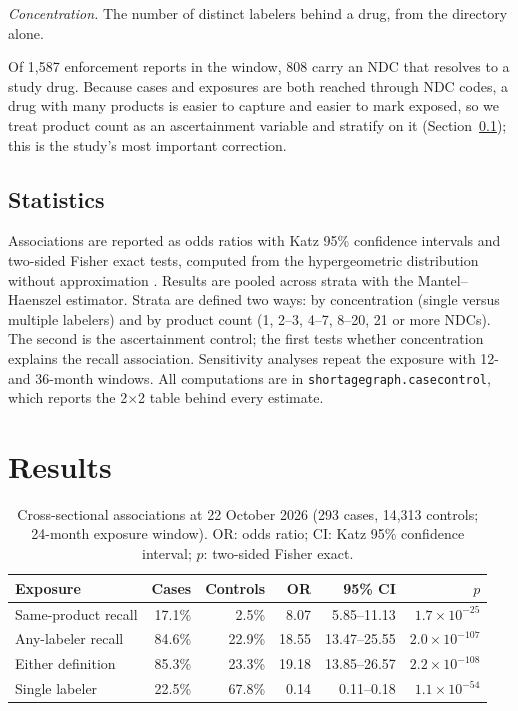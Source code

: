\documentclass[conference,letterpaper]{IEEEtran}
\begin{document}
\emph{Concentration.} The number of distinct labelers behind a drug, from the
directory alone.

Of 1{,}587 enforcement reports in the window, 808 carry an NDC that resolves to
a study drug. Because cases and exposures are both reached through NDC codes, a
drug with many products is easier to capture and easier to mark exposed, so we
treat product count as an ascertainment variable and stratify on it
(Section~\ref{sec:analysis}); this is the study's most important correction.

\subsection{Statistics}\label{sec:analysis}
Associations are reported as odds ratios with Katz 95\% confidence intervals and
two-sided Fisher exact tests, computed from the hypergeometric distribution
without approximation \cite{rothman}. Results are pooled across strata with the
Mantel--Haenszel estimator. Strata are defined two ways: by concentration
(single versus multiple labelers) and by product count (1, 2--3, 4--7, 8--20,
21 or more NDCs). The second is the ascertainment control; the first tests
whether concentration explains the recall association. Sensitivity analyses
repeat the exposure with 12- and 36-month windows. All computations are in
\texttt{shortagegraph.casecontrol}, which reports the 2$\times$2 table behind
every estimate.

\section{Results}

\begin{table}[t]
\caption{Cross-sectional associations at 22 October 2026 (293 cases, 14{,}313
controls; 24-month exposure window). OR: odds ratio; CI: Katz 95\% confidence
interval; $p$: two-sided Fisher exact.}
\label{tab:assoc}
\centering
\footnotesize
\setlength{\tabcolsep}{1.6pt}
\begin{tabular}{@{}lrrrrr@{}}
\hline
Exposure & Cases & Controls & OR & 95\% CI & $p$\\
\hline
Same-product recall & 17.1\% & 2.5\% & 8.07 & 5.85--11.13 & $1.7\!\times\!10^{-25}$\\
Any-labeler recall & 84.6\% & 22.9\% & 18.55 & 13.47--25.55 & $2.0\!\times\!10^{-107}$\\
Either definition & 85.3\% & 23.3\% & 19.18 & 13.85--26.57 & $2.2\!\times\!10^{-108}$\\
Single labeler & 22.5\% & 67.8\% & 0.14 & 0.11--0.18 & $1.1\!\times\!10^{-54}$\\
\hline
\end{tabular}
\end{table}
\end{document}
